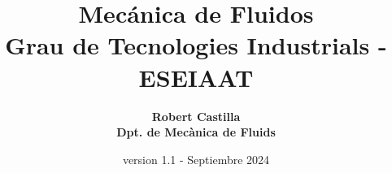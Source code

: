 \documentclass[a4paper,12pt]{book}
\begin{document}
\author{\bfseries{Robert Castilla} \\
	Dpt. de Mecànica de Fluids}
\title{Mecánica de Fluidos
	\\ {\large Grau de Tecnologies Industrials - ESEIAAT}}
\date{version 1.1 - Septiembre 2024}

\frontmatter
\maketitle
\tableofcontents

\mainmatter













\backmatter

\nocite{*}
\printbibliography
\end{document}
